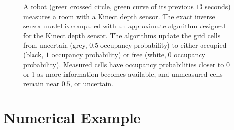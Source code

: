 \documentclass[letterpaper, 10pt, conference]{ieeeconf}
\newcommand{\refeqn}[1]{(\ref{eqn:#1})}
\begin{document}

\begin{figure}
\centerline{
}
\centerline{
}
\centerline{
}
\centerline{
}
\centerline{
}
\caption{A robot (green crossed circle, green curve of its previous $13$ seconds) measures a room with a Kinect depth sensor. The exact inverse sensor model is compared with an approximate algorithm designed for the Kinect depth sensor. The algorithms update the grid cells from uncertain (grey, $0.5$ occupancy probability) to either occupied (black, $1$ occupancy probability) or free (white, $0$ occupancy probability). Measured cells have occupancy probabilities closer to $0$ or $1$ as more information becomes available, and unmeasured cells remain near $0.5$, or uncertain.
}
\label{fig:NumResOccProbs}
\end{figure}

	
\section{Numerical Example}
\label{sec:NumRes}

\end{document}
